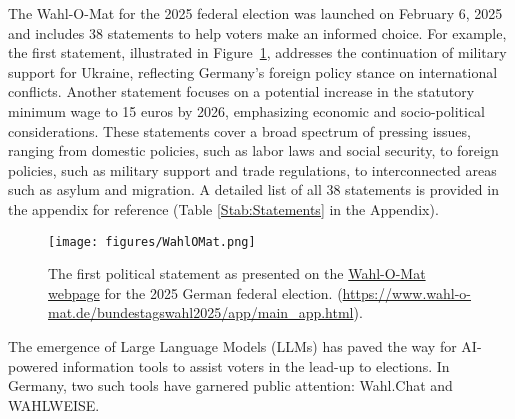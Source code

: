 \documentclass[
	fontsize=10pt,          %
	numbers=noenddot,    	%
    parskip=half,        	%
    listof=totoc,        	%
    bibliography=totoc,  	%
	headsepline=true,       %
	footsepline=false, 		%
    DIV=12                	%
]{scrartcl}
\begin{document}
The Wahl-O-Mat for the 2025 federal election was launched on February 6, 2025 and includes 38 statements to help voters make an informed choice. 
For example, the first statement, illustrated in Figure~\ref{fig:WahlOMat}, addresses the continuation of military support for Ukraine, reflecting Germany's foreign policy stance on international conflicts. 
Another statement focuses on a potential increase in the statutory minimum wage to 15 euros by 2026, emphasizing economic and socio-political considerations.
These statements cover a broad spectrum of pressing issues, ranging from domestic policies, such as labor laws and social security, to foreign policies, such as military support and trade regulations, to interconnected areas such as asylum and migration.
A detailed list of all 38 statements is provided in the appendix for reference (Table \ref{Stab:Statements} in the Appendix).

\begin{figure}[ht]
    \centering
    \texttt{[image: figures/WahlOMat.png]}
    \caption{The first political statement as presented on the \href{https://www.wahl-o-mat.de/bundestagswahl2025/app/main_app.html}{Wahl-O-Mat webpage} for the 2025 German federal election. (\url{https://www.wahl-o-mat.de/bundestagswahl2025/app/main_app.html}).%
    }
    \label{fig:WahlOMat}
\end{figure}


The emergence of Large Language Models (LLMs) has paved the way for AI-powered information tools to assist voters in the lead-up to elections.
In Germany, two such tools have garnered public attention: Wahl.Chat and WAHLWEISE.
\end{document}

